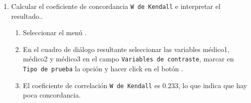 \begin{enumerate}[leftmargin=*]
\begin{enumerate}
\item Calcular el coeficiente de concordancia \texttt{W de Kendall} e interpretar el resultado..
\begin{indicacion}
\begin{enumerate}
\item Seleccionar el menú .
\item En el cuadro de diálogo resultante seleccionar las variables \textsf{médico1}, \textsf{médico2} y \textsf{médico3} en el campo
\texttt{Variables de contraste}, marcar en  \texttt{Tipo de prueba} la opción  y hacer click en el botón .
\item El coeficiente de correlación \texttt{W de Kendall} es $0.233$, lo que indica que hay poca concordancia.
\end{enumerate}
\end{indicacion}
\end{enumerate}
\end{enumerate}


